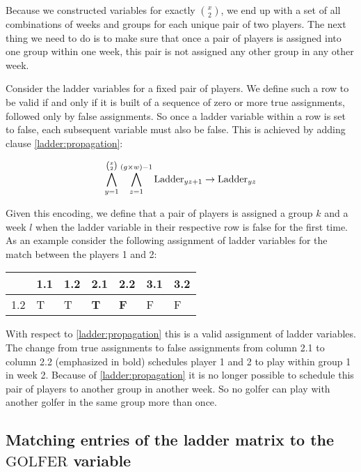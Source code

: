 \documentclass[a4paper]{scrartcl}
\begin{document}
Because we constructed variables for exactly ${x \choose 2}$, we end up with a set of all combinations of weeks and groups for each unique pair of two players. The next thing we need to do is to make sure that once a pair of players is assigned into one group within one week, this pair is not assigned any other group in any other week.

Consider the ladder variables for a fixed pair of players. We define such a row to be valid if and only if it is built of a sequence of zero or more true assignments, followed only by false assignments. So once a ladder variable within a row is set to false, each subsequent variable must also be false. This is achieved by adding clause \ref{ladder:propagation}:

\begin{equation}
\label{ladder:propagation}
\centering
    \bigwedge \limits_{y=1}^{{x \choose 2}}
    \bigwedge \limits_{z=1}^{(g \times w)-1}
    \text{Ladder}_{yz+1}
    \to
    \text{Ladder}_{yz}
\end{equation}

Given this encoding, we define that a pair of players is assigned a group $k$ and a week $l$ when the ladder variable in their respective row is false for the first time. As an example consider the following assignment of ladder variables for the match between the players 1 and 2:

\begin{table}[h]
\centering
\begin{tabular}{ l | l | l | l | l | l | l }
    & 1.1 & 1.2 & 2.1 & 2.2 & 3.1 & 3.2 \\
\hline
1.2 & T & T & \textbf{T} & \textbf{F} & F & F \\
\end{tabular}
\end{table}

With respect to \ref{ladder:propagation} this is a valid assignment of ladder variables. The change from true assignments to false assignments from column 2.1 to column 2.2 (emphasized in bold) schedules player 1 and 2 to play within group 1 in week 2. Because of \ref{ladder:propagation} it is no longer possible to schedule this pair of players to another group in another week. So no golfer can play with another golfer in the same group more than once.


\subsection{Matching entries of the ladder matrix to the $\text{GOLFER}$ variable}
\end{document}

